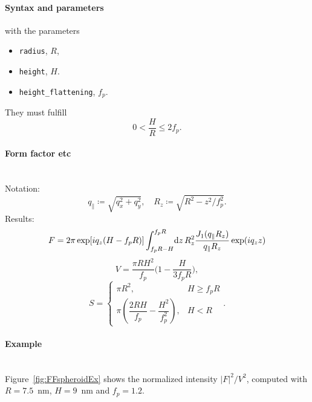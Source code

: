 \paragraph{Syntax and parameters}
\begin{quote}
\end{quote}
with the parameters
\begin{itemize}
\item \texttt{radius}, $R$,
\item \texttt{height}, $H$.
\item \texttt{height\_flattening}, $f_p$.
\end{itemize}
They must fulfill
\begin{displaymath}
  0< \dfrac{H}{R}\le 2f_p.
\end{displaymath}


\paragraph{Form factor etc}\strut\\
Notation:
\begin{equation*} 
  q_{\parallel} \coloneqq \sqrt{q_x^2+q_y^2}, \quad
  R_z \coloneqq \sqrt{R^2-z^2/f_p^2}.
\end{equation*} 
Results:
\begin{equation*} 
F =   2\pi \exp[iq_z(H-f_pR)] \int_{f_p R-H}^{f_p R} \!\text{d} z\,
     R_z^2\frac{J_1(q_{\parallel}R_z)}{q_{\parallel}R_z} \exp(i q_z z) 
\end{equation*}
\begin{equation*}
  V = \dfrac{\pi R H^2}{f_p}  \Big(1-\dfrac{H}{3f_p R}\Big),
\end{equation*}
\begin{equation*}
  S = \left\{\begin{array}{ll} \pi R^2, & H \geq f_pR \\
         \pi\left(\dfrac{2RH}{f_p}-\dfrac{H^2}{f_p^2}\right), & H < R \end{array}\right..
\end{equation*}

\paragraph{Example}\strut\\
Figure~\ref{fig:FFspheroidEx} shows the normalized intensity
$|F|^2/V^2$, computed with $R=7.5$~nm, $H=9$~nm and $f_p=1.2$.

